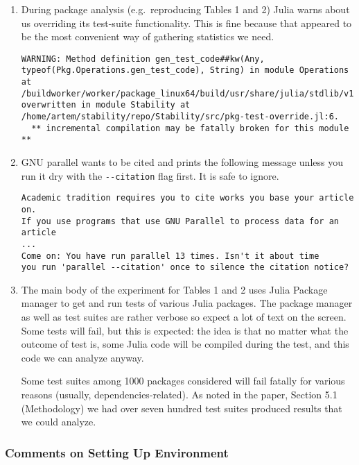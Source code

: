 \documentclass[
]{article}
\begin{document}
\begin{enumerate}
\def\labelenumi{\arabic{enumi}.}
\item
  During package analysis (e.g.~reproducing Tables 1 and 2) Julia warns
  about us overriding its test-suite functionality. This is fine because
  that appeared to be the most convenient way of gathering statistics we
  need.

\begin{verbatim}
WARNING: Method definition gen_test_code##kw(Any, typeof(Pkg.Operations.gen_test_code), String) in module Operations at /buildworker/worker/package_linux64/build/usr/share/julia/stdlib/v1.5/Pkg/src/Operations.jl:1316 overwritten in module Stability at /home/artem/stability/repo/Stability/src/pkg-test-override.jl:6.
  ** incremental compilation may be fatally broken for this module **
\end{verbatim}
\item
  GNU parallel wants to be cited and prints the following message unless
  you run it dry with the \texttt{-\/-citation} flag first. It is safe
  to ignore.

\begin{verbatim}
Academic tradition requires you to cite works you base your article on.
If you use programs that use GNU Parallel to process data for an article
...
Come on: You have run parallel 13 times. Isn't it about time 
you run 'parallel --citation' once to silence the citation notice?
\end{verbatim}
\item
  The main body of the experiment for Tables 1 and 2 uses Julia Package
  manager to get and run tests of various Julia packages. The package
  manager as well as test suites are rather verbose so expect a lot of
  text on the screen. Some tests will fail, but this is expected: the
  idea is that no matter what the outcome of test is, some Julia code
  will be compiled during the test, and this code we can analyze anyway.

  Some test suites among 1000 packages considered will fail fatally for
  various reasons (usually, dependencies-related). As noted in the
  paper, Section 5.1 (Methodology) we had over seven hundred test suites
  produced results that we could analyze.
\end{enumerate}

\hypertarget{comments-on-setting-up-environment}{%
\subsubsection{Comments on Setting Up
Environment}\label{comments-on-setting-up-environment}}
\end{document}
